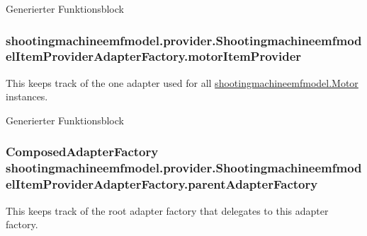 Generierter Funktionsblock \hypertarget{classshootingmachineemfmodel_1_1provider_1_1_shootingmachineemfmodel_item_provider_adapter_factory_a6f78629c961ec98bc5cc5e126dfcd2e4}{
\subsubsection[{motor\-Item\-Provider}]{ shootingmachineemfmodel.\-provider.\-Shootingmachineemfmodel\-Item\-Provider\-Adapter\-Factory.\-motor\-Item\-Provider\hspace{0.3cm}{\ttfamily [protected]}}}\label{classshootingmachineemfmodel_1_1provider_1_1_shootingmachineemfmodel_item_provider_adapter_factory_a6f78629c961ec98bc5cc5e126dfcd2e4}
This keeps track of the one adapter used for all \hyperlink{interfaceshootingmachineemfmodel_1_1_motor}{shootingmachineemfmodel.\-Motor} instances.

Generierter Funktionsblock \hypertarget{classshootingmachineemfmodel_1_1provider_1_1_shootingmachineemfmodel_item_provider_adapter_factory_aefa932b17c6961fbfbead5540d214176}{
\subsubsection[{parent\-Adapter\-Factory}]{\setlength{\rightskip}{0pt plus 5cm}Composed\-Adapter\-Factory shootingmachineemfmodel.\-provider.\-Shootingmachineemfmodel\-Item\-Provider\-Adapter\-Factory.\-parent\-Adapter\-Factory\hspace{0.3cm}{\ttfamily [protected]}}}\label{classshootingmachineemfmodel_1_1provider_1_1_shootingmachineemfmodel_item_provider_adapter_factory_aefa932b17c6961fbfbead5540d214176}
This keeps track of the root adapter factory that delegates to this adapter factory.

